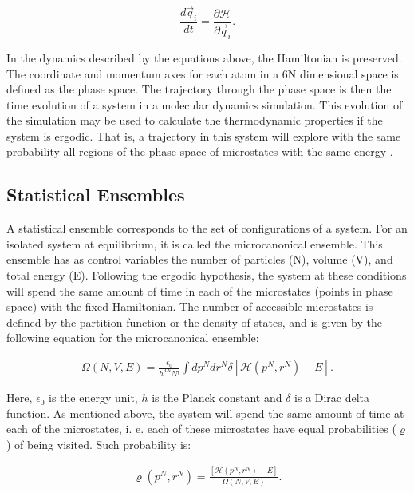 \begin{equation}
\frac{d \vec{q}_{i}}{dt} =  \frac{\partial \mathcal{H}}{\partial \vec{q}_{i}}.
\end{equation}

In the dynamics described by the equations above, the Hamiltonian is preserved. The coordinate and momentum axes for each atom in a 6N dimensional space is defined as the phase space. The trajectory through the phase space is then the time evolution of a system in a molecular dynamics simulation. This evolution of the simulation may be used to calculate the thermodynamic properties if the system is ergodic. That is, a trajectory in this system will explore with the same probability all regions of the phase space of microstates with the same energy \cite{shell2015}. 

\subsection{Statistical Ensembles}

A statistical ensemble corresponds to the set of configurations of a system. For an isolated system at equilibrium, it is called the microcanonical ensemble. This ensemble has as control variables the number of particles (N), volume (V), and total energy (E). Following the ergodic hypothesis, the system at these conditions will spend the same amount of time in each of the microstates (points in phase space) with the fixed Hamiltonian.  The number of accessible microstates is defined by the partition function or the density of states, and  is given by the following equation  for the microcanonical ensemble: 

\begin{equation}
\begin{aligned}
\Omega (N,V,E) = \frac{\epsilon_{0}}{h^{3N}N!} \int dp^{N} dr^{N} \delta [\mathcal{H}(p^{N},r^{N}) -E].
\end{aligned}
\end{equation}

Here, $\epsilon _{0}$ is the energy unit, $h$ is the Planck constant and $\delta$ is a Dirac delta function. As mentioned above, the system will spend the same amount of time at each of the microstates, i. e. each of these microstates have equal probabilities ($\varrho$) of being visited. Such probability is:

\begin{equation}
\begin{aligned}
\varrho (p^{N},r^{N}) = \frac{[\mathcal{H}(p^{N},r^{N}) -E]}{ \Omega (N,V,E)} .
\end{aligned}
\end{equation}

